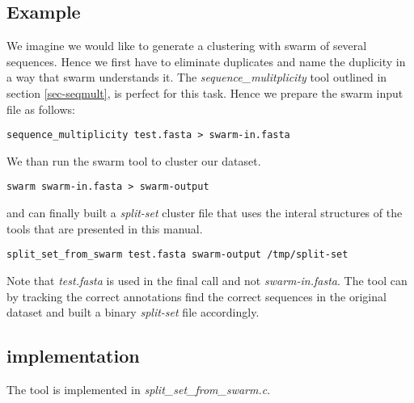 \subsection{Example}
We imagine we would like to generate a clustering with swarm of
several sequences. Hence we first have to eliminate duplicates and
name the duplicity in a way that swarm understands it. The
\emph{sequence\_mulitplicity} tool outlined in section
\ref{sec-seqmult}, is perfect for this task. Hence we prepare the
swarm input file as follows:
\begin{lstlisting}
sequence_multiplicity test.fasta > swarm-in.fasta
\end{lstlisting}
We than run the swarm tool to cluster our dataset.
\begin{lstlisting}
swarm swarm-in.fasta > swarm-output
\end{lstlisting}
and can finally built a \emph{split-set} cluster file that uses the interal
structures of the tools that are presented in this
manual.
\begin{lstlisting}
split_set_from_swarm test.fasta swarm-output /tmp/split-set
\end{lstlisting}
Note that \emph{test.fasta} is used in the final call and not
\emph{swarm-in.fasta}. The tool can by tracking the correct
annotations find the correct sequences in the original dataset and
built a binary \emph{split-set} file accordingly.

\subsection{implementation}
The tool is implemented in \emph{split\_set\_from\_swarm.c}.
